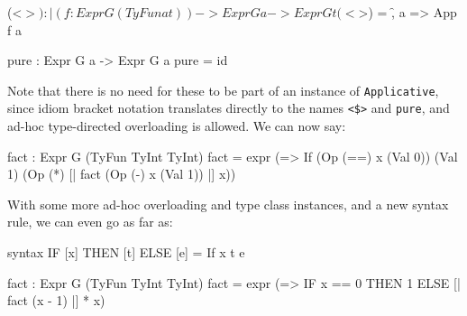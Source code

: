 \begin{code}
(<$>) : |(f : Expr G (TyFun a t)) -> Expr G a -> Expr G t
(<$>) = \f, a => App f a

pure : Expr G a -> Expr G a
pure = id
\end{code} 

\noindent
Note that there is no need for these to be part of an instance of \texttt{Applicative},
since idiom bracket notation translates directly to the names \texttt{<\$>} and
\texttt{pure}, and ad-hoc type-directed overloading is allowed. We can now say:

\begin{code}
fact : Expr G (TyFun TyInt TyInt)
fact = expr (\x => If (Op (==) x (Val 0))
                      (Val 1) (Op (*) [| fact (Op (-) x (Val 1)) |] x))
\end{code} 

\noindent
With some more ad-hoc overloading and type class instances, and a new
syntax rule, we can even go as far as:

\begin{code}
syntax IF [x] THEN [t] ELSE [e] = If x t e

fact : Expr G (TyFun TyInt TyInt)
fact = expr (\x => IF x == 0 THEN 1 ELSE [| fact (x - 1) |] * x)
\end{code} 

